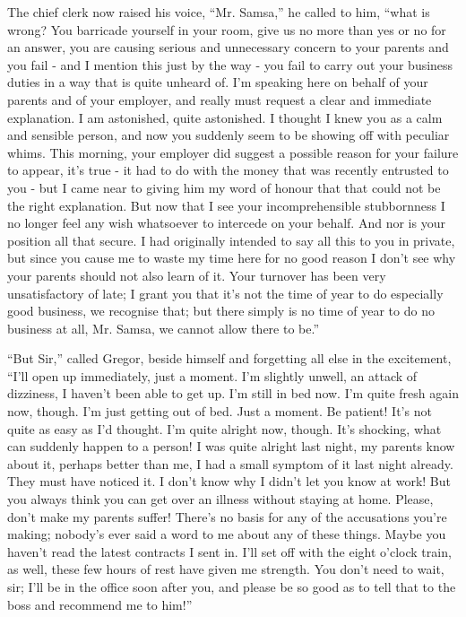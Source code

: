\documentclass[12pt]{report}
\begin{document}
The chief clerk now raised his voice, ``Mr. Samsa,'' he called to him,
``what is wrong? You barricade yourself in your room, give us no more
than yes or no for an answer, you are causing serious and unnecessary
concern to your parents and you fail - and I mention this just by the
way - you fail to carry out your business duties in a way that is quite
unheard of. I'm speaking here on behalf of your parents and of your
employer, and really must request a clear and immediate explanation. I
am astonished, quite astonished. I thought I knew you as a calm and
sensible person, and now you suddenly seem to be showing off with
peculiar whims. This morning, your employer did suggest a possible
reason for your failure to appear, it's true - it had to do with the
money that was recently entrusted to you - but I came near to giving him
my word of honour that that could not be the right explanation. But now
that I see your incomprehensible stubbornness I no longer feel any wish
whatsoever to intercede on your behalf. And nor is your position all
that secure. I had originally intended to say all this to you in
private, but since you cause me to waste my time here for no good reason
I don't see why your parents should not also learn of it. Your turnover
has been very unsatisfactory of late; I grant you that it's not the time
of year to do especially good business, we recognise that; but there
simply is no time of year to do no business at all, Mr. Samsa, we cannot
allow there to be.''

``But Sir,'' called Gregor, beside himself and forgetting all else in
the excitement, ``I'll open up immediately, just a moment. I'm slightly
unwell, an attack of dizziness, I haven't been able to get up. I'm still
in bed now. I'm quite fresh again now, though. I'm just getting out of
bed. Just a moment. Be patient! It's not quite as easy as I'd thought.
I'm quite alright now, though. It's shocking, what can suddenly happen
to a person! I was quite alright last night, my parents know about it,
perhaps better than me, I had a small symptom of it last night already.
They must have noticed it. I don't know why I didn't let you know at
work! But you always think you can get over an illness without staying
at home. Please, don't make my parents suffer! There's no basis for any
of the accusations you're making; nobody's ever said a word to me about
any of these things. Maybe you haven't read the latest contracts I sent
in. I'll set off with the eight o'clock train, as well, these few hours
of rest have given me strength. You don't need to wait, sir; I'll be in
the office soon after you, and please be so good as to tell that to the
boss and recommend me to him!''
\end{document}

